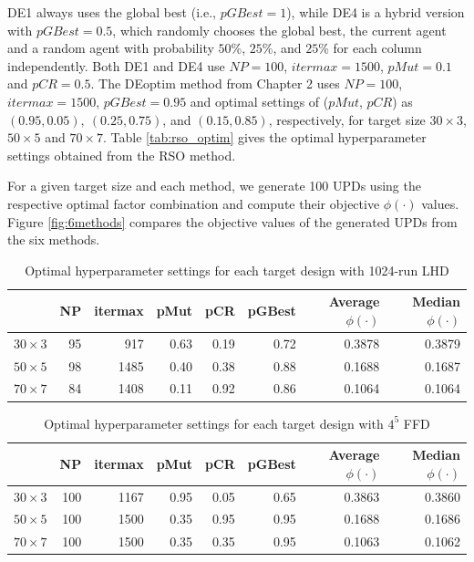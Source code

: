 \documentclass [PhD] {package/uclathes}
\begin{document}
DE1 always uses the global best (i.e., $pGBest=1$), while DE4 is a hybrid version with $pGBest=0.5$, which randomly chooses the global best, the current agent and a random agent with probability $50$\%, $25$\%, and $25$\% for each column independently. Both DE1 and DE4 use $NP = 100$, $itermax = 1500$, $pMut = 0.1$ and $pCR = 0.5$. The DEoptim method from Chapter 2 uses  $NP = 100$, $itermax = 1500$, $pGBest = 0.95$ and optimal settings of ($pMut$, $pCR$) as $(0.95, 0.05),~ (0.25, 0.75)$, and $(0.15, 0.85)$, respectively, for target size $30\times3$, $50\times5$ and $70\times7$. Table \ref{tab:rso_optim} gives the optimal hyperparameter settings obtained from  the RSO method.


For a given target size and each method, we generate 100 UPDs using the respective optimal factor combination and compute their objective $\phi(\cdot)$ values.  Figure \ref{fig:6methods} compares the objective values of the generated UPDs from the six methods.


\begin{table}

\caption{\label{tab:lhd_optim}Optimal hyperparameter settings for each target design with 1024-run LHD}
\centering
\begin{tabular}[t]{l|r|r|r|r|r|r|r}
\hline
  & NP & itermax & pMut & pCR & pGBest & Average $\phi(\cdot)$ & Median $\phi(\cdot)$\\
\hline
$30\times3$ & 95 & 917 & 0.63 & 0.19 & 0.72 & 0.3878 & 0.3879\\
\hline
$50\times5$ & 98 & 1485 & 0.40 & 0.38 & 0.88 & 0.1688 & 0.1687\\
\hline
$70\times7$ & 84 & 1408 & 0.11 & 0.92 & 0.86 & 0.1064 & 0.1064\\
\hline
\end{tabular}
\end{table}\begin{table}

\caption{\label{tab:grid_optim}Optimal hyperparameter settings for each target design with $4^5$ FFD}
\centering
\begin{tabular}[t]{l|r|r|r|r|r|r|r}
\hline
  & NP & itermax & pMut & pCR & pGBest & Average $\phi(\cdot)$ & Median $\phi(\cdot)$\\
\hline
$30\times3$ & 100 & 1167 & 0.95 & 0.05 & 0.65 & 0.3863 & 0.3860\\
\hline
$50\times5$ & 100 & 1500 & 0.35 & 0.95 & 0.95 & 0.1688 & 0.1686\\
\hline
$70\times7$ & 100 & 1500 & 0.35 & 0.35 & 0.95 & 0.1063 & 0.1062\\
\hline
\end{tabular}
\end{table}
\end{document}
